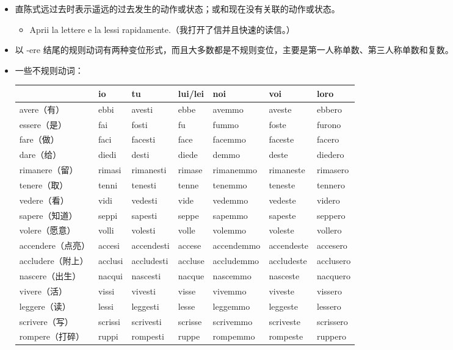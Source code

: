 \documentclass[UTF8,a4paper,titlepage,10pt]{report}
\begin{document}
\begin{enumerate}
\begin{itemize}
\item 直陈式远过去时表示遥远的过去发生的动作或状态；或和现在没有关联的动作或状态。
\begin{itemize}
\item Aprii la lettere e la lessi rapidamente.（我打开了信并且快速的读信。）
\end{itemize}
\item 以 -ere 结尾的规则动词有两种变位形式，而且大多数都是不规则变位，主要是第一人称单数、第三人称单数和复数。
\item 一些不规则动词：
\begin{center}
\begin{tabular}{lllllll}
 & io & tu & lui/lei & noi & voi & loro\\
\hline
avere（有） & ebbi & avesti & ebbe & avemmo & aveste & ebbero\\
essere（是） & fai & fosti & fu & fummo & foste & furono\\
fare（做） & faci & facesti & face & facemmo & faceste & facero\\
dare（给） & diedi & desti & diede & demmo & deste & diedero\\
rimanere（留） & rimasi & rimanesti & rimase & rimanemmo & rimaneste & rimasero\\
tenere（取） & tenni & tenesti & tenne & tenemmo & teneste & tennero\\
vedere（看） & vidi & vedesti & vide & vedemmo & vedeste & videro\\
sapere（知道） & seppi & sapesti & seppe & sapemmo & sapeste & seppero\\
volere（愿意） & volli & volesti & volle & volemmo & voleste & vollero\\
accendere（点亮） & accesi & accendesti & accese & accendemmo & accendeste & accesero\\
accludere（附上） & acclusi & accludesti & accluse & accludemmo & accludeste & acclusero\\
nascere（出生） & nacqui & nascesti & nacque & nascemmo & nasceste & nacquero\\
vivere（活） & vissi & vivesti & visse & vivemmo & viveste & vissero\\
leggere（读） & lessi & leggesti & lesse & leggemmo & leggeste & lessero\\
scrivere（写） & scrissi & scrivesti & scrisse & scrivemmo & scriveste & scrissero\\
rompere（打碎） & ruppi & rompesti & ruppe & rompemmo & rompeste & ruppero\\

\end{tabular}
\end{center}
\end{itemize}
\end{enumerate}
\end{document}
